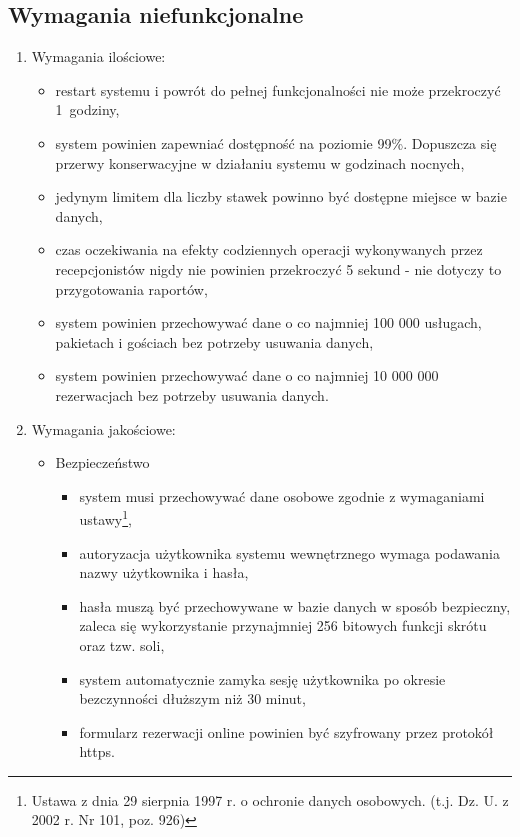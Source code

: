 \documentclass[a4paper,onecolumn,oneside,11pt,wide,floatssmall]{mwrep}
\theoremstyle{definition}
\theoremstyle{plain}%
\theoremstyle{remark}
\begin{document}
\subsection{Wymagania niefunkcjonalne}

\begin{enumerate}
  \item Wymagania ilościowe:
    \begin{itemize}
      \item restart systemu i powrót do pełnej funkcjonalności nie może przekroczyć \mbox{1 godziny},
      \item system powinien zapewniać dostępność na poziomie 99\%. Dopuszcza się przerwy konserwacyjne w działaniu 
      systemu w godzinach nocnych,
      \item jedynym limitem dla liczby stawek powinno być dostępne miejsce w bazie danych,
      \item czas oczekiwania na efekty codziennych operacji wykonywanych przez recepcjonistów nigdy nie powinien 
      przekroczyć 5 sekund - nie dotyczy to przygotowania raportów,
      \item system powinien przechowywać dane o co najmniej 100 000 usługach, pakietach i gościach bez potrzeby 
      usuwania danych,
      \item system powinien przechowywać dane o co najmniej 10 000 000 rezerwacjach bez potrzeby usuwania danych.
    \end{itemize}
  \item Wymagania jakościowe:
    \begin{itemize}
      \item Bezpieczeństwo
        \begin{itemize}
          \item system musi przechowywać dane osobowe zgodnie z wymaganiami ustawy\footnote{Ustawa z dnia 29 sierpnia 
          1997 r. o ochronie danych osobowych. (t.j. Dz. U. z 2002 r. Nr 101, poz. 926)},
          \item autoryzacja użytkownika systemu wewnętrznego wymaga podawania nazwy użytkownika i hasła,
          \item hasła muszą być przechowywane w bazie danych w sposób bezpieczny, zaleca się wykorzystanie 
          przynajmniej 256 bitowych funkcji skrótu oraz tzw. soli,
          \item system automatycznie zamyka sesję użytkownika po okresie bezczynności dłuższym niż 30 minut,
          \item formularz rezerwacji online powinien być szyfrowany przez protokół https.

\end{itemize}
\end{itemize}
\end{enumerate}
\end{document}
